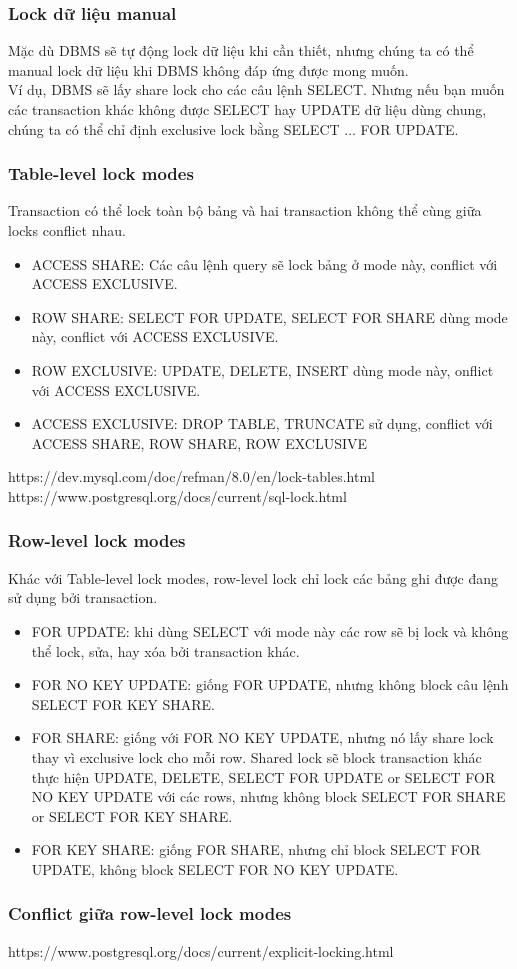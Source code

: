 \documentclass[xcolor={table, dvipsnames}]{beamer}
\begin{document}
\begin{frame}
\frametitle{Lock dữ liệu manual}
Mặc dù DBMS sẽ tự động lock dữ liệu khi cần thiết, nhưng chúng ta có thể manual lock dữ liệu khi DBMS không đáp ứng được mong muốn.\\
Ví dụ, DBMS sẽ lấy share lock cho các câu lệnh SELECT. Nhưng nếu bạn muốn các transaction khác không được SELECT hay UPDATE dữ liệu dùng chung, chúng ta có thể chỉ định exclusive lock bằng SELECT ... FOR UPDATE.
\end{frame}

\begin{frame}
\frametitle{Table-level lock modes}
Transaction có thể lock toàn bộ bảng và hai transaction không thể cùng giữa locks conflict nhau.
\begin{itemize}
\item ACCESS SHARE: Các câu lệnh query sẽ lock bảng ở mode này, conflict với ACCESS EXCLUSIVE.
\item ROW SHARE: SELECT FOR UPDATE, SELECT FOR SHARE dùng mode này, conflict với ACCESS EXCLUSIVE.
\item ROW EXCLUSIVE: UPDATE, DELETE, INSERT dùng mode này, onflict với ACCESS EXCLUSIVE.
\item ACCESS EXCLUSIVE: DROP TABLE, TRUNCATE sử dụng, conflict với ACCESS SHARE, ROW SHARE, ROW EXCLUSIVE
\end{itemize}
https://dev.mysql.com/doc/refman/8.0/en/lock-tables.html\\
https://www.postgresql.org/docs/current/sql-lock.html
\end{frame}

\begin{frame}
\frametitle{Row-level lock modes}
Khác với Table-level lock modes, row-level lock chỉ lock các bảng ghi được đang sử dụng bởi transaction.
\begin{itemize}
\item FOR UPDATE: khi dùng SELECT với mode này các row sẽ bị lock và không thể lock, sửa, hay xóa bởi transaction khác.
\item FOR NO KEY UPDATE: giống FOR UPDATE, nhưng không block câu lệnh  SELECT FOR KEY SHARE.
\item FOR SHARE: giống với FOR NO KEY UPDATE, nhưng nó lấy share lock thay vì exclusive lock cho mỗi row. Shared lock sẽ block transaction khác thực hiện UPDATE, DELETE, SELECT FOR UPDATE or SELECT FOR NO KEY UPDATE với các rows, nhưng không block SELECT FOR SHARE or SELECT FOR KEY SHARE.
\item FOR KEY SHARE: giống FOR SHARE, nhưng chỉ block SELECT FOR UPDATE, không block SELECT FOR NO KEY UPDATE.
\end{itemize}
\end{frame}
\begin{frame}
\frametitle{Conflict giữa row-level lock modes}
https://www.postgresql.org/docs/current/explicit-locking.html
\end{frame}
\end{document}
